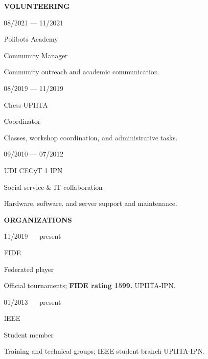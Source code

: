 \documentclass[%
               singlesided,
               paper=a4,
               fontsize=9pt
              ]{my-resume}
\makeatletter
\newlength{\cvbodygutter}
\newlength{\cvsectionrulewidth}
\newlength{\cvmaincolwd}
\renewcommand{\section}[2][]{%
    \par\addvspace{0.55em}%
    \ifstrequal{#1}{}{}{\normalsize \makebox[5mm][c]{#1}\hspace{0.5em}}
    {\color{heading}\large\bfseries\MakeUppercase{#2}}\\[-1ex]%
    \noindent{\color{heading}\rule{\cvsectionrulewidth}{0.8pt}\par}\vspace{0.2em}
}
\renewcommand{\job}[4]{%
    \needspace{4\baselineskip}%
    \setlength{\jobdateplacelength}{0.29\linewidth}%
    \setlength{\jobpositionlength}{0.71\linewidth}%
    \begin{minipage}[t]{\jobdateplacelength}%
        \raggedright
        \footnotesize
        \begin{minipage}[t]{3mm}%
            \makebox[3mm][c]{\faCalendar}
        \end{minipage}%
        \hspace{0.4em}%
        \begin{minipage}[t]{\dimexpr \jobdateplacelength-3mm-0.4em}%
            #1
        \end{minipage}%
        \par\vspace{0.05em}
        \begin{minipage}[t]{3mm}%
            \makebox[3mm][c]{\faMapMarker}
        \end{minipage}%
        \hspace{0.4em}%
        \begin{minipage}[t]{\dimexpr \jobdateplacelength-3mm-0.4em}%
            #2
        \end{minipage}%
    \end{minipage}%
    \begin{minipage}[t]{\jobpositionlength}%
        \raggedright
        {\normalsize \color{emphasis} #3}
    \end{minipage}%
    \ifstrequal{#4}{}{}{\par\vspace{0.04em}\begingroup\footnotesize\raggedright #4\endgroup}
    \par\normalsize\vspace{0.12em}
}
\renewcommand{\makebody}{%
    \setlength{\cvmaincolwd}{\dimexpr\textwidth-\highlightwidth-\cvbodygutter\relax}%
    \setlength{\columnsep}{\cvbodygutter}%
    \setcolumnwidth{\highlightwidth, \cvmaincolwd}%
    \begin{paracol}{2}
        \noindent\@highlightbar
        \switchcolumn
        \noindent\@mainbar
    \end{paracol}
}
\newcommand{\cvheadline}[1]{\def\@cvheadline{#1}}
\newcommand{\cvsummary}[1]{\def\@cvsummary{#1}}
\newcommand{\cvheaderfooter}[1]{\def\@cvheaderfooter{#1}}
\def\@cvheadline{}
\def\@cvsummary{}
\def\@cvheaderfooter{}
\makeatother
\begin{document}
{    \section{Volunteering}

    \job{08/2021 --- 11/2021}
        {Polibots Academy}
        {Community Manager}
        {Community outreach and academic communication.}

    \job{08/2019 --- 11/2019}
        {Chess UPIITA}
        {Coordinator}
        {Classes, workshop coordination, and administrative tasks.}

    \job{09/2010 --- 07/2012}
        {UDI CECyT 1 IPN}
        {Social service \& IT collaboration}
        {Hardware, software, and server support and maintenance.}

    \section{Organizations}

    \job{11/2019 --- present}
        {FIDE}
        {Federated player}
        {Official tournaments; \textbf{FIDE rating 1599.} UPIITA-IPN.}

    \job{01/2013 --- present}
        {IEEE}
        {Student member}
        {Training and technical groups; IEEE student branch UPIITA-IPN.}
}

\makebody
\clearpage
\pagestyle{cvpage}%

\cvheadline{Ingeniera de IA aplicada | LLMs · AI Agents · Sistemas de recuperación}
\cvheaderfooter{México · CDMX}
\cvsummary{Ingeniera de IA aplicada con experiencia construyendo aplicaciones LLM de grado producción, agentes de IA, sistemas RAG (\emph{retrieval-augmented generation}) y flujos de automatización inteligente. Sólida base en aprendizaje automático, optimización y métodos numéricos, junto con experiencia práctica en microservicios, arquitecturas orientadas a eventos y herramientas de desarrollo potenciadas por IA.}
\end{document}

